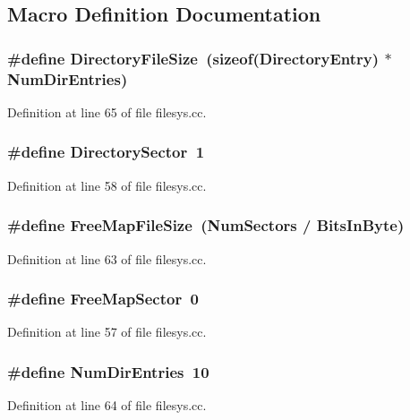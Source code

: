\subsection{Macro Definition Documentation}
\subsubsection[{Directory\+File\+Size}]{\setlength{\rightskip}{0pt plus 5cm}\#define Directory\+File\+Size~(sizeof({\bf Directory\+Entry}) $\ast$ {\bf Num\+Dir\+Entries})}\label{filesys_8cc_a7fa3c2eb16686ae45ae59ff299c933d8}


Definition at line 65 of file filesys.\+cc.

\subsubsection[{Directory\+Sector}]{\setlength{\rightskip}{0pt plus 5cm}\#define Directory\+Sector~1}\label{filesys_8cc_a1e8a87bff0b10df73c4c8aebd74cd115}


Definition at line 58 of file filesys.\+cc.

\subsubsection[{Free\+Map\+File\+Size}]{\setlength{\rightskip}{0pt plus 5cm}\#define Free\+Map\+File\+Size~({\bf Num\+Sectors} / {\bf Bits\+In\+Byte})}\label{filesys_8cc_a38a724e7fcf2a63b3281f36fac7e1d22}


Definition at line 63 of file filesys.\+cc.

\subsubsection[{Free\+Map\+Sector}]{\setlength{\rightskip}{0pt plus 5cm}\#define Free\+Map\+Sector~0}\label{filesys_8cc_acfabd79a397da2bebf0645af84a9885c}


Definition at line 57 of file filesys.\+cc.

\subsubsection[{Num\+Dir\+Entries}]{\setlength{\rightskip}{0pt plus 5cm}\#define Num\+Dir\+Entries~10}\label{filesys_8cc_a68dc84ed1ccf98eee5190f1a2120079a}


Definition at line 64 of file filesys.\+cc.

